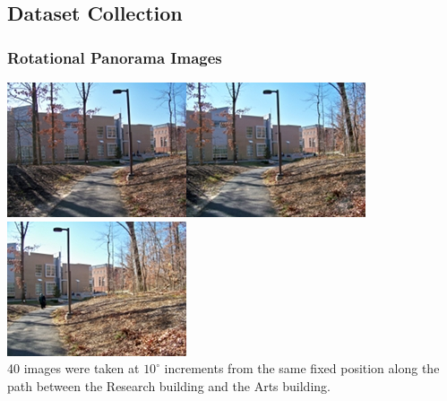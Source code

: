 \documentclass{beamer}
\begin{document}
\subsection{Dataset Collection}
\frame
{
 	\frametitle{Rotational Panorama Images}
	\includegraphics[scale =.5]{rptImages/100_2992.jpg}\includegraphics[scale =.5]{rptImages/100_2993.jpg}\includegraphics[scale =.5]{rptImages/100_2994.jpg}\\
	40 images were taken at $10^{\circ}$ increments from the same fixed position along the path between the Research building and the Arts building.
}
\end{document}
